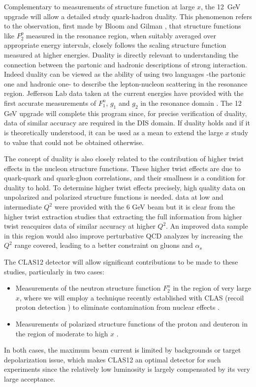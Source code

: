 Complementary to measurements of structure function at large $x$, the
12~GeV upgrade will allow a detailed study quark-hadron duality. This 
phenomenon refers to the observation, first made by Bloom and Gilman 
\cite{BG}, that structure functions like $F_2^p$ measured in the resonance 
region, when suitably averaged over appropriate energy intervals, closely
follows the scaling structure function measured at higher energies.
Duality is directly relevant to understanding the connection between the 
partonic and hadronic descriptions of strong interaction. Indeed duality 
can be viewed as the ability of using two languages -the partonic one
and hadronic one- to describe the lepton-nucleon scattering in the 
resonance region. Jefferson Lab data taken at the current energies have 
provided with the first accurate measurements of $F_1^n$, $g_1$ and $g_2$ in 
the resonance domain \cite{Dharmawardane:2006zd, d2n, BOSTED EG1b, BONUS, E01-012}. 
The 12 GeV upgrade will complete this program since, for precise 
verification of duality, data of similar accuracy are required in the 
DIS domain. If duality holds and if it is theoretically understood, it 
can be used as a mean to extend the large $x$ study to value that 
could not be obtained otherwise.


The concept of duality is also closely related to the contribution of
higher twist effects in the nucleon structure functions. These higher twist
effects are due to quark-quark and quark-gluon correlations, and their 
smallness is a condition for duality to hold. To determine higher twist
effects precisely, high quality data on unpolarized and polarized structure 
functions is needed. data at low and intermediate $Q^2$ were provided with
the 6 GeV beam but it is clear from the higher twist extraction studies that
extracting the full information from higher twist reacquires data of similar 
accuracy at higher $Q^2$. An improved data sample in this region would also 
improve perturbative QCD analyzes by increasing the $Q^2$ range covered, 
leading to a better constraint on gluons and $\alpha _s$


The CLAS12 detector will allow significant
contributions to be made to these studies, particularly in two cases:
%
\begin{itemize}
\item Measurements of the neutron structure function $F_2^n$ in the region
of very large $x$, where we will employ a technique recently established 
with CLAS (recoil proton detection \cite{BONUS}) to eliminate contamination 
from nuclear effects \cite{BONUS12}. 

\item Measurements of polarized structure functions of the proton and
deuteron in the region of moderate to high $x$ \cite{EG12}.
\end{itemize}
%
In both cases, the maximum beam current is limited by backgrounds or
target depolarization issue, which makes CLAS12 an optimal detector for
such experiments since the relatively low luminosity is largely compensated 
by its very large acceptance.

